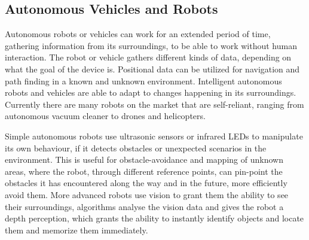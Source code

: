 





\subsection{Autonomous Vehicles and Robots}

Autonomous robots or vehicles can work for an extended period of time, gathering information from its surroundings, to be able to work without human interaction. The robot or vehicle gathers different kinds of data, depending on what the goal of the device is. Positional data can be utilized for navigation and path finding in a known and unknown environment. Intelligent autonomous robots and vehicles are able to adapt to changes happening in its surroundings.
Currently there are many robots on the market that are self-reliant, ranging from autonomous vacuum cleaner to drones and helicopters\cite{autonomousbasic}.

Simple autonomous robots use ultrasonic sensors or infrared LEDs to manipulate its own behaviour, if it detects obstacles or unexpected scenarios in the environment. This is useful for obstacle-avoidance and mapping of unknown areas, where the robot, through different reference points, can pin-point the obstacles it has encountered along the way and in the future, more efficiently avoid them.
More advanced robots use vision to grant them the ability to see their surroundings, algorithms analyse the vision data and gives the robot a depth perception, which grants the ability to instantly identify objects and locate them and memorize them immediately\cite{obstacles}.

